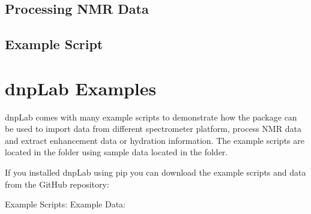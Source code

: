 \documentclass[letterpaper,10pt,english]{sphinxmanual}
\begin{document}
\subsection{Processing NMR Data}
\label{\detokenize{quick-start:processing-nmr-data}}
\begin{sphinxVerbatim}[commandchars=\\\{\}]
   
   
   
\end{sphinxVerbatim}


\subsection{Example Script}
\label{\detokenize{quick-start:example-script}}

\section{dnpLab Examples}
\label{\detokenize{examples:dnplab-examples}}\label{\detokenize{examples::doc}}
dnpLab comes with many example scripts to demonstrate how the package can be used to import data from different spectrometer platform, process NMR data and extract enhancement data or hydration information. The example scripts are located in the  folder using sample data located in the  folder.

If you installed dnpLab using pip you can download the example scripts and data from the GitHub repository:

Example Scripts:    
Example Data:    
\end{document}
